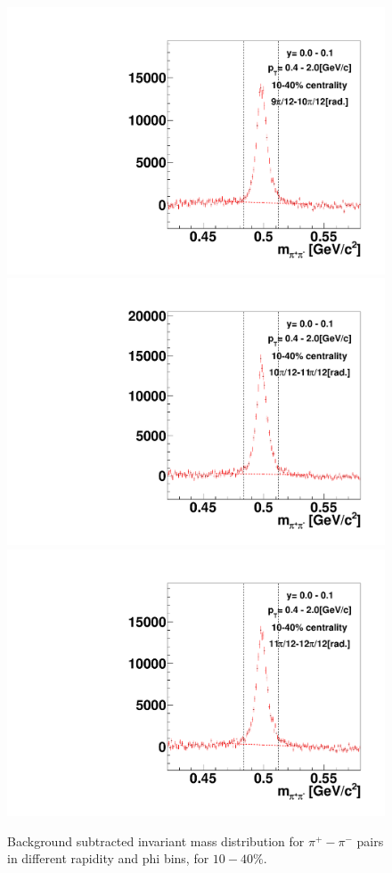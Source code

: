 \begin{figure}[h]
\includegraphics[width=0.14\linewidth]{chapterX/fig/ks_v1_sig/kf_ptslice0_cent1_ks_flow_phi10_rap4.pdf}
\includegraphics[width=0.14\linewidth]{chapterX/fig/ks_v1_sig/kf_ptslice0_cent1_ks_flow_phi11_rap4.pdf}
\includegraphics[width=0.14\linewidth]{chapterX/fig/ks_v1_sig/kf_ptslice0_cent1_ks_flow_phi12_rap4.pdf}

\caption{Background subtracted invariant mass distribution for $\pi^{+}-\pi^{-}$ pairs in different rapidity and phi bins, for $10-40\%$.}
\label{ks_v1_sig}
\end{figure}

